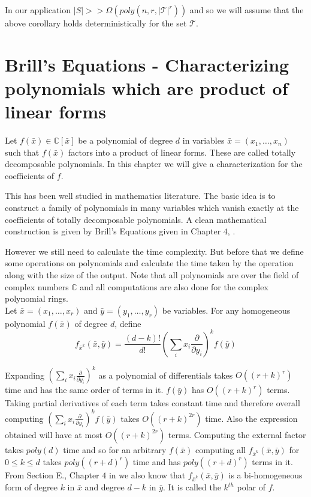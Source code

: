 \documentclass[12pt]{caltech_thesis}
\theoremstyle{plain}
\theoremstyle{definition}
\newcommand{\MT}{\mathcal{T}}
\newcommand{\C}{\mathbb{C}}
\newcommand{\B}[1]{\bar{#1}}
\begin{document}
In our application $|S| >> \Omega(poly(n,r, |\MT|^r))$ and so we will assume that the above corollary holds deterministically for the set $\MT$.

\chapter{Brill's Equations - Characterizing polynomials which are product of linear forms}\label{appendix:brills}

Let $f(\B{x})\in \C[\B{x}]$ be a polynomial of degree $d$ in variables $\B{x} = (x_1,\ldots,x_n)$ such that $f(\B{x})$ factors into a 
product of linear forms. These are called
totally decomposable polynomials. In this chapter we will give a characterization for the coefficients of $f$. 


This has been well studied in  mathematics literature. The basic idea is to construct a family of polynomials in many variables which vanish
exactly at the coefficients of totally decomposable polynomials. A clean mathematical construction is given by Brill's Equations given in Chapter $4$,
\cite{GKZ94}.

However we still need to calculate the time complexity. But before that we define some operations on
polynomials and calculate the time taken by the operation along with the size of the output. Note that all polynomials are
over the field of complex numbers $\C$ and all computations are also done for the complex polynomial rings.\\

Let $\B{x} = (x_1,\ldots,x_r)$ and $\B{y} = (y_1,\ldots,y_r)$ be variables. For any homogeneous polynomial $f(\B{x})$
of degree $d$, define
\[
 f_{\B{x}^k}(\B{x},\B{y}) = \frac{(d-k)!}{d!}(\sum\limits_{i}x_i\frac{\partial}{\partial y_i})^k f(\B{y})
\]

Expanding $(\sum\limits_{i}x_i\frac{\partial}{\partial y_i})^k$ as a polynomial of differentials takes
$O((r+k)^r)$ time and has the same order of terms in it. $f(\B{y})$ has $O((r+k)^r)$ terms. Taking
partial derivatives of each term takes constant time and therefore overall computing
$(\sum\limits_{i}x_i\frac{\partial}{\partial y_i})^k f(\B{y})$ takes $O((r+k)^{2r})$ time. Also
the expression obtained will have at most $O((r+k)^{2r})$ terms. Computing the external
factor takes $poly(d)$ time and so for an arbitrary $f(\B{x})$ computing all $f_{\B{x}^k}(\B{x},\B{y})$
for $0\leq k\leq d$ takes $poly((r+d)^r)$ time and has $poly((r+d)^r)$ terms in it. From Section E., Chapter $4$ in \cite{GKZ94}
we also know that $f_{\B{x}^k}(\B{x},\B{y})$ is a bi-homogeneous form of degree $k$ in $\B{x}$ and degree $d-k$ in $\B{y}$. It
is called the $k^{th}$ polar of $f$.\\
\end{document}
